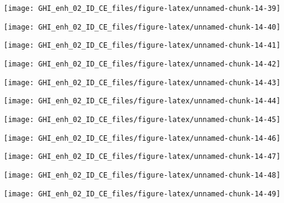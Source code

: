 \documentclass[
  10pt,
  a4paper,oneside]{article}
\begin{document}
\begin{center}\texttt{[image: GHI\_enh\_02\_ID\_CE\_files/figure-latex/unnamed-chunk-14-39]} \end{center}

\begin{center}\texttt{[image: GHI\_enh\_02\_ID\_CE\_files/figure-latex/unnamed-chunk-14-40]} \end{center}

\begin{center}\texttt{[image: GHI\_enh\_02\_ID\_CE\_files/figure-latex/unnamed-chunk-14-41]} \end{center}

\begin{center}\texttt{[image: GHI\_enh\_02\_ID\_CE\_files/figure-latex/unnamed-chunk-14-42]} \end{center}

\begin{center}\texttt{[image: GHI\_enh\_02\_ID\_CE\_files/figure-latex/unnamed-chunk-14-43]} \end{center}

\begin{center}\texttt{[image: GHI\_enh\_02\_ID\_CE\_files/figure-latex/unnamed-chunk-14-44]} \end{center}

\begin{center}\texttt{[image: GHI\_enh\_02\_ID\_CE\_files/figure-latex/unnamed-chunk-14-45]} \end{center}

\begin{center}\texttt{[image: GHI\_enh\_02\_ID\_CE\_files/figure-latex/unnamed-chunk-14-46]} \end{center}

\begin{center}\texttt{[image: GHI\_enh\_02\_ID\_CE\_files/figure-latex/unnamed-chunk-14-47]} \end{center}

\begin{center}\texttt{[image: GHI\_enh\_02\_ID\_CE\_files/figure-latex/unnamed-chunk-14-48]} \end{center}

\begin{center}\texttt{[image: GHI\_enh\_02\_ID\_CE\_files/figure-latex/unnamed-chunk-14-49]} \end{center}
\end{document}

